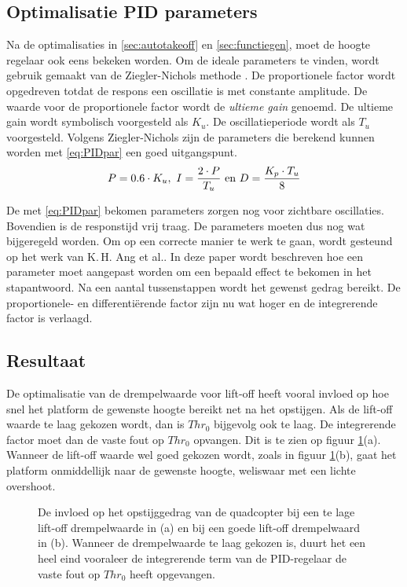 \subsection{Optimalisatie PID parameters} \label{sec:optPID}
Na de optimalisaties in \ref{sec:autotakeoff} en \ref{sec:functiegen}, moet de hoogte regelaar ook eens bekeken worden. Om de ideale parameters te vinden, wordt gebruik gemaakt van de Ziegler-Nichols methode \cite{paper:ZieglerNichols}. De proportionele factor wordt opgedreven totdat de respons een oscillatie is met constante amplitude. De waarde voor de proportionele factor wordt de \textit{ultieme gain} genoemd. De ultieme gain wordt symbolisch voorgesteld als $K_u$. De oscillatieperiode wordt als $T_u$ voorgesteld. Volgens Ziegler-Nichols zijn de parameters die berekend kunnen worden met \eqref{eq:PIDpar} een goed uitgangspunt. 
\begin{equation}
	\centering
	P = 0.6 \cdot K_u,\ I = \dfrac{2 \cdot P}{T_u} \text{ en }D = \dfrac{K_p \cdot T_u}{8}
	\label{eq:PIDpar}
\end{equation}

\npar De met \eqref{eq:PIDpar} bekomen parameters zorgen nog voor zichtbare oscillaties. Bovendien is de responstijd vrij traag. De parameters moeten dus nog wat bijgeregeld worden. Om op een correcte manier te werk te gaan, wordt gesteund op het werk van K.\,H. Ang et al.\cite{paper:PIDtuning}. In deze paper wordt beschreven hoe een parameter moet aangepast worden om een bepaald effect te bekomen in het stapantwoord. Na een aantal tussenstappen wordt het gewenst gedrag bereikt. De proportionele- en differenti\"erende factor zijn nu wat hoger en de integrerende factor is verlaagd.

\subsection{Resultaat}
De optimalisatie van de drempelwaarde voor lift-off heeft vooral invloed op hoe snel het platform de gewenste hoogte bereikt net na het opstijgen. Als de lift-off waarde te laag gekozen wordt, dan is $Thr_0$ bijgevolg ook te laag. De integrerende factor moet dan de vaste fout op $Thr_0$ opvangen. Dit is te zien op figuur \ref{fig:opstijgen}(a). Wanneer de lift-off waarde wel goed gekozen wordt, zoals in figuur \ref{fig:opstijgen}(b), gaat het platform onmiddellijk naar de gewenste hoogte, weliswaar met een lichte overshoot.

\begin{figure}
	\begin{center}
		
	\end{center}
	\centering
	\caption{De invloed op het opstijggedrag van de quadcopter bij een te lage lift-off drempelwaarde in (a) en bij een goede lift-off drempelwaard in (b). Wanneer de drempelwaarde te laag gekozen is, duurt het een heel eind vooraleer de integrerende term van de PID-regelaar de vaste fout op $Thr_0$ heeft opgevangen.}\label{fig:opstijgen}
\end{figure}

